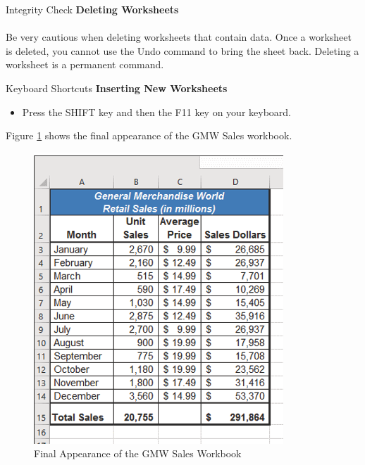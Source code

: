 \begin{center}
	\begin{infobox}{Integrity Check}
		\textbf{Deleting Worksheets}
		\\
		\\
		Be very cautious when deleting worksheets that contain data. Once a worksheet is deleted, you cannot use the Undo command to bring the sheet back. Deleting a worksheet is a permanent command.
	\end{infobox}
\end{center}

\begin{center}
	\begin{shtcutbox}{Keyboard Shortcuts}
		\textbf{Inserting New Worksheets}
		\\
		\begin{itemize}
			\setlength{\itemsep}{0pt}
			\setlength{\parskip}{0pt}
			\setlength{\parsep}{0pt}
			
			\item Press the SHIFT key and then the F11 key on your keyboard.
			
		\end{itemize}
	\end{shtcutbox}
\end{center}


Figure \ref{01:fig48} shows the final appearance of the GMW Sales workbook.

\begin{figure}[H]
	\centering
	\includegraphics[width=\maxwidth{.95\linewidth}]{gfx/ch01_fig48}
	\caption{Final Appearance of the GMW Sales Workbook}
	\label{01:fig48}
\end{figure}

